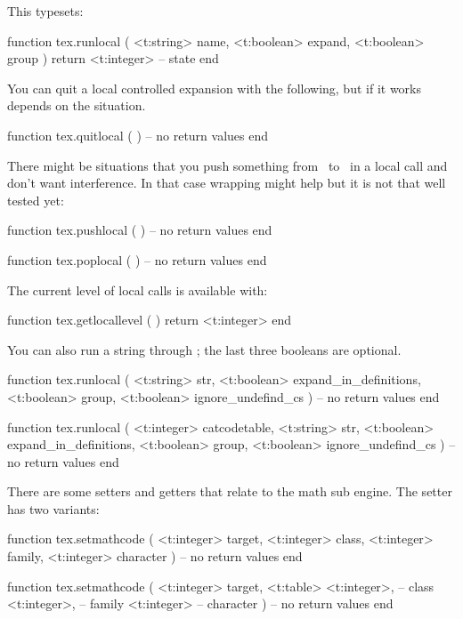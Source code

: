 \typebuffer

This typesets: \inlinebuffer

\starttyping[option=LUA]
function tex.runlocal (
    <t:string>  name,
    <t:boolean> expand,
    <t:boolean> group
)
    return <t:integer> -- state
end
\stoptyping

You can quit a local controlled expansion with the following, but if it works
depends on the situation.

\starttyping[option=LUA]
function tex.quitlocal ( )
    -- no return values
end
\stoptyping

There might be situations that you push something from \LUA\ to \TEX\ in a local
call and don't want interference. In that case wrapping might help but it is not
that well tested yet:

\starttyping[option=LUA]
function tex.pushlocal ( )
    -- no return values
end

function tex.poplocal  ( )
    -- no return values
end
\stoptyping

The current level of local calls is available with:

\starttyping[option=LUA]
function tex.getlocallevel ( )
    return <t:integer>
end
\stoptyping

You can also run a string through \TEX; the last three booleans are optional.

\starttyping[option=LUA]
function tex.runlocal (
    <t:string>  str,
    <t:boolean> expand_in_definitions,
    <t:boolean> group,
    <t:boolean> ignore_undefind_cs
)
    -- no return values
end

function tex.runlocal (
    <t:integer> catcodetable,
    <t:string>  str,
    <t:boolean> expand_in_definitions,
    <t:boolean> group,
    <t:boolean> ignore_undefind_cs
)
    -- no return values
end
\stoptyping

\stopsubsection

\startsubsection[title=Math]

There are some setters and getters that relate to the math sub engine. The setter has two variants:

\starttyping[option=LUA]
function tex.setmathcode (
    <t:integer> target,
    <t:integer> class,
    <t:integer> family,
    <t:integer> character
)
    -- no return values
end

function tex.setmathcode (
    <t:integer> target,
    <t:table>   {
        <t:integer>, -- class
        <t:integer>, -- family
        <t:integer>  -- character
    }
)
    -- no return values
end
\stoptyping

